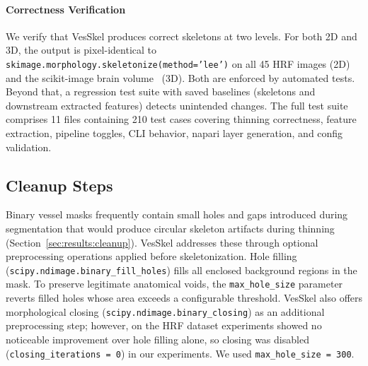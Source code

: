 \documentclass[11pt]{article}
\begin{document}
\paragraph{Correctness Verification}\label{sec:methods:impl:tests}

We verify that VesSkel produces correct skeletons at two levels. For
both 2D and 3D, the output is pixel-identical to
\texttt{skimage.morphology.skeletonize(method='lee')} on all 45 HRF
images (2D) and the scikit-image brain volume~\cite{skimage} (3D).
Both are enforced by automated tests. Beyond that, a regression test
suite with saved baselines (skeletons and downstream extracted
features) detects unintended changes. The full test suite comprises
11 files containing 210 test cases covering thinning correctness,
feature extraction, pipeline toggles, CLI behavior, napari layer
generation, and config validation.

\subsection{Cleanup Steps}\label{sec:methods:cleanup}

Binary vessel masks frequently contain small holes and gaps
introduced during segmentation that would produce circular skeleton
artifacts during thinning (Section~\ref{sec:results:cleanup}).
VesSkel addresses these through optional preprocessing operations
applied before skeletonization. Hole filling
(\texttt{scipy.ndimage.binary\_fill\_holes}) fills all enclosed
background regions in the mask. To preserve legitimate anatomical
voids, the \texttt{max\_hole\_size} parameter reverts filled holes
whose area exceeds a configurable threshold. VesSkel also offers
morphological closing (\texttt{scipy.ndimage.binary\_closing}) as an
additional preprocessing step; however, on the HRF dataset
experiments showed no noticeable improvement over hole filling alone,
so closing was disabled (\texttt{closing\_iterations = 0}) in our
experiments. We used \texttt{max\_hole\_size = 300}.
\end{document}
